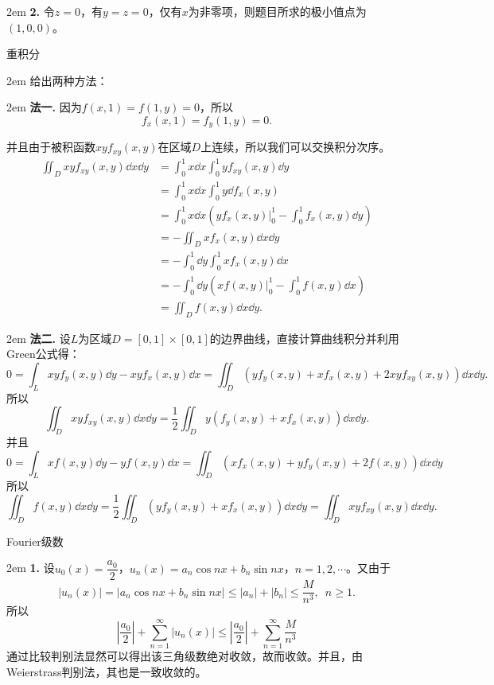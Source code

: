 \documentclass[UTF8,14pt,normal]{ctexart}
\begin{document}
    \hangindent 2em
    \noindent
    \textbf{2.}
    令\(z=0\)，有\(y = z = 0\)，仅有\(x\)为非零项，则题目所求的极小值点为\((1,0,0)\)。
    
 重积分

    \hangindent 2em
    \noindent
    给出两种方法：

    \hangindent 2em
    \noindent
    \textbf{法一.}
    因为\(f(x,1) = f(1,y) = 0\)，所以\[f_x(x,1) = f_y(1,y) = 0.\]
    
    并且由于被积函数\(xyf_{xy}(x,y)\)在区域\(D\)上连续，所以我们可以交换积分次序。
    \begin{equation*}
        \begin{split}
            \iint_{D}xyf_{xy}(x,y)\dd x\dd y &= \int_{0}^{1}x\dd x\int_{0}^{1}yf_{xy}(x,y)\dd y\\
            &= \int_{0}^{1}x\dd x\int_{0}^{1}y\dd f_{x}(x,y)\\
            &= \int_{0}^{1}x\dd x\left(yf_x(x,y)\bigg|_0^1-\int_{0}^{1}f_x(x,y)\dd y\right)\\
            &= -\iint_{D}xf_x(x,y)\dd x\dd y\\
            &= -\int_{0}^{1}\dd y\int_{0}^{1}xf_x(x,y)\dd x\\
            &= -\int_{0}^{1}\dd y\left(xf(x,y)\bigg|_0^1-\int_{0}^{1}f(x,y)\dd x\right)\\
            &= \iint_{D}f(x,y)\dd x\dd y.
        \end{split}
    \end{equation*}

    \hangindent 2em
    \noindent
    \textbf{法二.}
    设\(L\)为区域\(D = [0,1]\times[0,1]\)的边界曲线，直接计算曲线积分并利用Green公式得：
    \[0 = \int_{L}xyf_y(x,y)\dd y-xyf_x(x,y)\dd x = \iint_{D}(yf_y(x,y)+xf_x(x,y)+2xyf_{xy}(x,y))\dd x\dd y.\]
    所以\[\iint_{D}xyf_{xy}(x,y)\dd x\dd y = \frac{1}{2}\iint_{D}y(f_y(x,y)+xf_x(x,y))\dd x\dd y.\]
    并且\[0 = \int_{L}xf(x,y)\dd y-yf(x,y)\dd x = \iint_{D}(xf_x(x,y)+yf_y(x,y)+2f(x,y))\dd x\dd y\]
    所以\[\iint_{D}f(x,y)\dd x\dd y = \frac{1}{2}\iint_{D}(yf_y(x,y)+xf_x(x,y))\dd x\dd y = \iint_Dxyf_{xy}(x,y)\dd x\dd y.\]

Fourier级数

    \hangindent 2em
    \noindent    
    \textbf{1.}
    设\(u_0(x) = \dfrac{a_0}{2}\)，\(u_n(x)=a_n\cos nx+b_n\sin nx\)，\(n=1,2,\cdots\)。又由于\[|u_n(x)|=|a_n\cos nx+b_n\sin nx|\leqslant|a_n|+|b_n|\leqslant\frac{M}{n^3},\enspace n\geqslant 1.\]
    所以\[|\frac{a_0}{2}|+\sum_{n=1}^\infty |u_n(x)|\leqslant|\frac{a_0}{2}|+\sum_{n=1}^{\infty}\frac{M}{n^3}\]
    通过比较判别法显然可以得出该三角级数绝对收敛，故而收敛。并且，由Weierstrass判别法，其也是一致收敛的。
    
\end{document}
